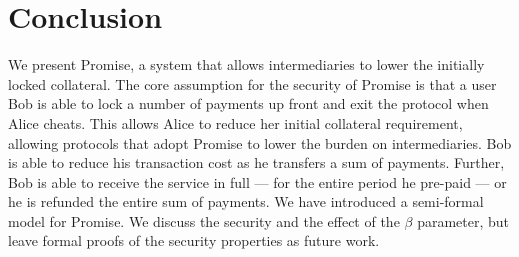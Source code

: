 \documentclass[runningheads]{llncs}
\newcommand{\sys}{Promise\xspace}
\newcommand{\todom}[1]{\todo[linecolor=green,backgroundcolor=green!25,bordercolor=green,inline,caption={}]{Todo for Dominik: #1}}
\begin{document}


\section{Conclusion}
\label{sec:conclusion}

We present \sys, a system that allows intermediaries to lower the initially locked collateral.
The core assumption for the security of \sys is that a user Bob is able to lock a number of payments up front and exit the protocol when Alice cheats.
This allows Alice to reduce her initial collateral requirement, allowing protocols that adopt \sys to lower the burden on intermediaries.
Bob is able to reduce his transaction cost as he transfers a sum of payments.
Further, Bob is able to receive the service in full --- for the entire period he pre-paid --- or he is refunded the entire sum of payments.
We have introduced a semi-formal model for \sys.
We discuss the security and the effect of the $\beta$ parameter, but leave formal proofs of the security properties as future work.




\end{document}
